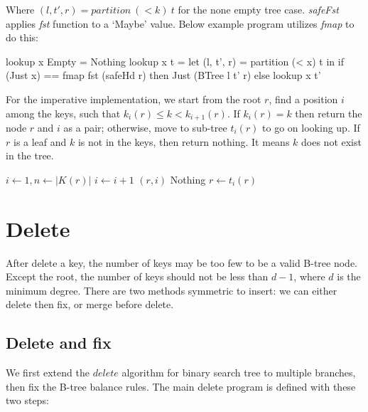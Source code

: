 \documentclass[b5paper]{article}
\begin{document}
Where $(l, t', r) = partition\ (< k)\ t$ for the none empty tree case. \textit{safeFst} applies \textit{fst} function to a `Maybe' value. Below example program utilizes \textit{fmap} to do this:

\begin{Haskell}
lookup x Empty = Nothing
lookup x t = let (l, t', r) = partition (< x) t in
  if (Just x) == fmap fst (safeHd r) then Just (BTree l t' r)
  else lookup x t'
\end{Haskell}

For the imperative implementation, we start from the root $r$, find a position $i$ among the keys, such that $k_i(r) \leq k < k_{i+1}(r)$. If $k_i(r) = k$ then return the node $r$ and $i$ as a pair; otherwise, move to sub-tree $t_i(r)$ to go on looking up. If $r$ is a leaf and $k$ is not in the keys, then return nothing. It means $k$ does not exist in the tree.

\begin{algorithmic}[1]
  \Loop
    \State $i \gets 1, n \gets |K(r)|$
      \State $i \gets i + 1$
    \EndWhile
      \State \Return $(r, i)$
    \EndIf
      \State \Return Nothing 
    \Else
      \State $r \gets t_i(r)$ 
    \EndIf
  \EndLoop
\EndFunction
\end{algorithmic}

\begin{Exercise}
\end{Exercise}

\section{Delete}

After delete a key, the number of keys may be too few to be a valid B-tree node. Except the root, the number of keys should not be less than $d - 1$, where $d$ is the minimum degree. There are two methods symmetric to insert: we can either delete then fix, or merge before delete.

\subsection{Delete and fix}

We first extend the $delete$ algorithm for binary search tree to multiple branches, then fix the B-tree balance rules. The main delete program is defined with these two steps:
\end{document}
